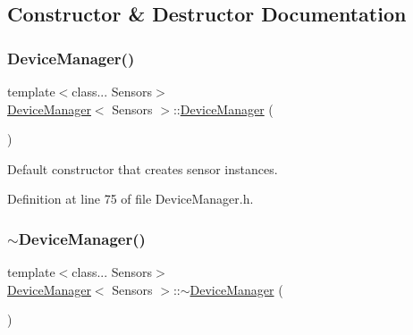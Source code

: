 \subsection{Constructor \& Destructor Documentation}
\mbox{\label{classDeviceManager_ac7804420230626193b647f3744d80d7f}} 
\subsubsection{\texorpdfstring{DeviceManager()}{DeviceManager()}}
{\footnotesize\ttfamily template$<$class... Sensors$>$ \\
\mbox{\hyperlink{classDeviceManager}{Device\+Manager}}$<$ Sensors $>$\+::\mbox{\hyperlink{classDeviceManager}{Device\+Manager}} (\begin{DoxyParamCaption}{ }\end{DoxyParamCaption})\hspace{0.3cm}{\ttfamily [inline]}}

Default constructor that creates sensor instances. 

Definition at line 75 of file Device\+Manager.\+h.


\begin{DoxyCode}{0}

\end{DoxyCode}
\mbox{\label{classDeviceManager_a750e88a618d6625436094c53ff9f22a8}} 
\subsubsection{\texorpdfstring{$\sim$DeviceManager()}{~DeviceManager()}}
{\footnotesize\ttfamily template$<$class... Sensors$>$ \\
\mbox{\hyperlink{classDeviceManager}{Device\+Manager}}$<$ Sensors $>$\+::$\sim$\mbox{\hyperlink{classDeviceManager}{Device\+Manager}} (\begin{DoxyParamCaption}{ }\end{DoxyParamCaption})\hspace{0.3cm}{\ttfamily [inline]}}

